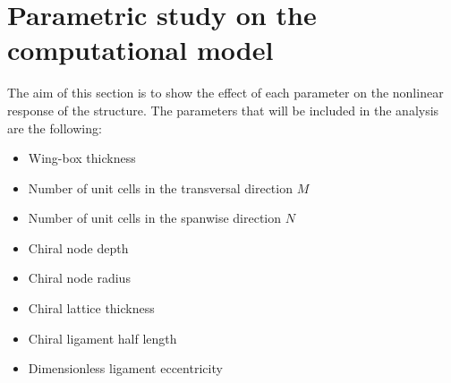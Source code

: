 \clearpage
\section{Parametric study on the computational model} \label{sec:computationalParametricStudy_results_sim}
  The aim of this section is to show the effect of each parameter on the nonlinear response of the structure. The parameters that will be included in the analysis are the following:

  \begin{itemize}
    \item Wing-box thickness \boxt
    \item Number of unit cells in the transversal direction $M$
    \item Number of unit cells in the spanwise direction $N$
    \item Chiral node depth \chiB
    \item Chiral node radius \chir
    \item Chiral lattice thickness \chit
    \item Chiral ligament half length \chiL
    \item Dimensionless ligament eccentricity \chie
  \end{itemize}

